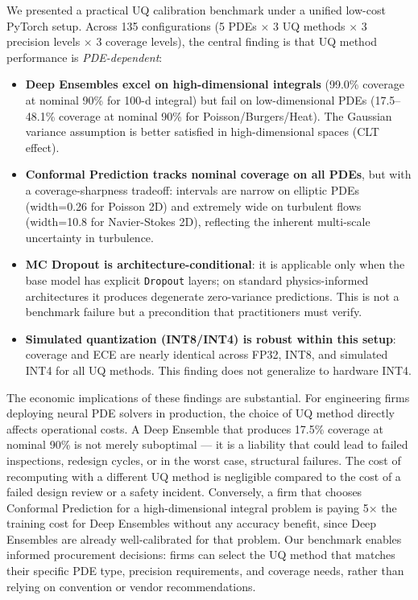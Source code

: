 \documentclass[12pt,a4paper]{article}
\theoremstyle{plain}
\begin{document}
We presented a practical UQ calibration benchmark under a unified low-cost
PyTorch setup.  Across 135 configurations (5 PDEs $\times$ 3 UQ methods
$\times$ 3 precision levels $\times$ 3 coverage levels), the central finding is
that UQ method performance is \emph{PDE-dependent}:

\begin{itemize}
    \item \textbf{Deep Ensembles excel on high-dimensional integrals}
        (99.0\% coverage at nominal 90\% for 100-d integral) but fail on
        low-dimensional PDEs (17.5--48.1\% coverage at nominal 90\%
        for Poisson/Burgers/Heat).  The Gaussian variance assumption
        is better satisfied in high-dimensional spaces (CLT effect).
    \item \textbf{Conformal Prediction tracks nominal coverage on all PDEs},
        but with a coverage-sharpness tradeoff: intervals are narrow on
        elliptic PDEs (width=0.26 for Poisson 2D) and extremely wide on
        turbulent flows (width=10.8 for Navier-Stokes 2D), reflecting the
        inherent multi-scale uncertainty in turbulence.
    \item \textbf{MC Dropout is architecture-conditional}: it is
        applicable only when the base model has explicit \texttt{Dropout}
        layers; on standard physics-informed architectures it produces
        degenerate zero-variance predictions.  This is not a benchmark
        failure but a precondition that practitioners must verify.
    \item \textbf{Simulated quantization (INT8/INT4) is robust within this setup}:
        coverage and ECE are nearly identical across FP32, INT8, and simulated INT4
        for all UQ methods.  This finding does not generalize to hardware INT4.
\end{itemize}

The economic implications of these findings are substantial. For engineering
firms deploying neural PDE solvers in production, the choice of UQ method
directly affects operational costs. A Deep Ensemble that produces 17.5\%
coverage at nominal 90\% is not merely suboptimal --- it is a liability that
could lead to failed inspections, redesign cycles, or in the worst case,
structural failures. The cost of recomputing with a different UQ method is
negligible compared to the cost of a failed design review or a safety incident.
Conversely, a firm that chooses Conformal Prediction for a high-dimensional
integral problem is paying 5× the training cost for Deep Ensembles without
any accuracy benefit, since Deep Ensembles are already well-calibrated for
that problem. Our benchmark enables informed procurement decisions: firms
can select the UQ method that matches their specific PDE type, precision
requirements, and coverage needs, rather than relying on convention or
vendor recommendations.
\end{document}
